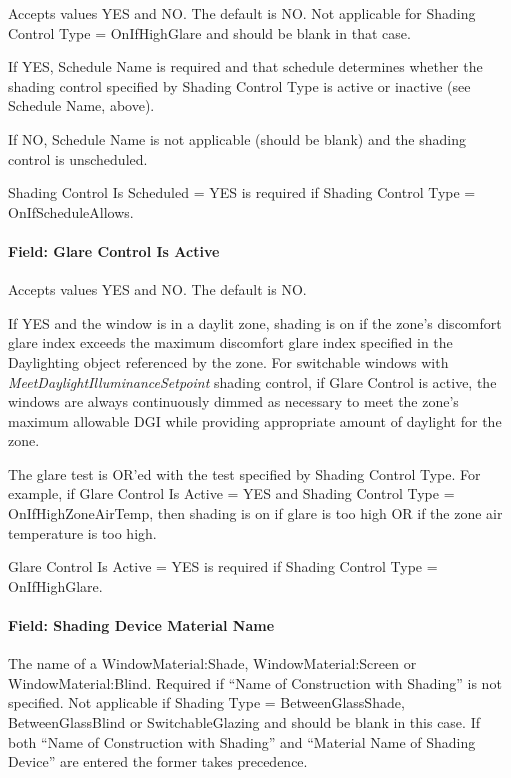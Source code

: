 Accepts values YES and NO. The default is NO. Not applicable for Shading Control Type = OnIfHighGlare and should be blank in that case.

If YES, Schedule Name is required and that schedule determines whether the shading control specified by Shading Control Type is active or inactive (see Schedule Name, above).

If NO, Schedule Name is not applicable (should be blank) and the shading control is unscheduled.

Shading Control Is Scheduled = YES is required if Shading Control Type = OnIfScheduleAllows.

\paragraph{Field: Glare Control Is Active}\label{field-glare-control-is-active}

Accepts values YES and NO. The default is NO.

If YES and the window is in a daylit zone, shading is on if the zone's discomfort glare index exceeds the maximum discomfort glare index specified in the Daylighting object referenced by the zone. For switchable windows with \emph{MeetDaylightIlluminanceSetpoint} shading control, if Glare Control is active, the windows are always continuously dimmed as necessary to meet the zone's maximum allowable DGI while providing appropriate amount of daylight for the zone.

The glare test is OR'ed with the test specified by Shading Control Type. For example, if Glare Control Is Active = YES and Shading Control Type = OnIfHighZoneAirTemp, then shading is on if glare is too high OR if the zone air temperature is too high.

Glare Control Is Active = YES is required if Shading Control Type = OnIfHighGlare.

\paragraph{Field: Shading Device Material Name}\label{field-shading-device-material-name}

The name of a WindowMaterial:Shade, WindowMaterial:Screen or WindowMaterial:Blind. Required if ``Name of Construction with Shading'' is not specified. Not applicable if Shading Type = BetweenGlassShade, BetweenGlassBlind or SwitchableGlazing and should be blank in this case. If both ``Name of Construction with Shading'' and ``Material Name of Shading Device'' are entered the former takes precedence.

